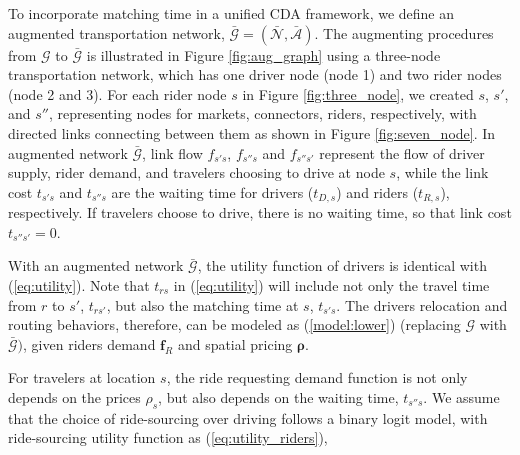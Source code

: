 \documentclass[review]{elsarticle}
\begin{document}
To incorporate matching time in a unified CDA framework, we define an augmented transportation network, $\bar{\mathcal{G}} = (\bar{\mathcal{N}}, \bar{\mathcal{A}})$. The augmenting procedures from  ${\mathcal{G}}$ to $\bar{\mathcal{G}}$ is illustrated in Figure \ref{fig:aug_graph} using a three-node transportation network, which has one driver node (node 1) and two rider nodes (node 2 and 3). For each rider node $s$ in Figure \ref{fig:three_node}, we created $s$, $s'$, and $s''$, representing nodes for markets, connectors, riders, respectively, with directed links connecting between them as shown in Figure \ref{fig:seven_node}. In augmented network $\bar{\mathcal{G}}$, link flow $f_{s's}$, $f_{s''s}$ and $f_{s''s'}$ represent the flow of driver supply, rider demand, and travelers choosing to drive at node $s$, while the link cost $t_{s's}$ and $t_{s''s}$ are the waiting time for drivers ($t_{D,s}$) and riders ($t_{R,s}$), respectively. If travelers choose to drive, there is no waiting time, so that link cost $t_{s''s'} = 0$. 


With an augmented network $\bar{\mathcal{G}}$, the utility function of drivers is identical with (\ref{eq:utility}). Note that $t_{rs}$ in (\ref{eq:utility}) will include not only the travel time from $r$ to $s'$, $t_{rs'}$, but also the matching time at $s$, $t_{s's}$. The drivers relocation and routing behaviors, therefore, can be modeled as (\ref{model:lower}) (replacing $\mathcal{G}$ with $\bar{\mathcal{G}})$, given riders demand $\bm{f}_{R}$ and spatial pricing $\bm{\rho}$.

For travelers at location $s$, the ride requesting demand function is not only depends on the prices $\rho_s$, but also depends on the waiting time, $t_{s''s}$. We assume that the choice of ride-sourcing over driving follows a binary logit model, with ride-sourcing utility function as (\ref{eq:utility_riders}),
\end{document}
